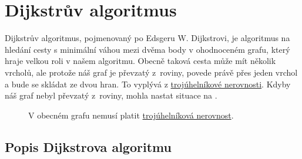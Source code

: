 \section{Dijkstrův algoritmus}
\label{sec:dijkstra}

Dijkstrův algoritmus, pojmenovaný po Edsgeru W. Dijkstrovi, je algoritmus na hledání cesty s minimální váhou mezi dvěma body v ohodnoceném grafu, který hraje velkou roli v našem algoritmu. Obecně taková cesta může mít několik vrcholů, ale protože náš graf je převzatý z~roviny, povede právě přes jeden vrchol a bude se skládat ze dvou hran. To vyplývá z \hyperref[definice:trojuhelnikova_nerovnost]{trojúhelníkové nerovnosti}. Kdyby náš graf nebyl převzatý z~roviny, mohla nastat situace na .

\begin{figure}[H]

    \centering
    \caption{V obecném grafu nemusí platit \hyperref[definice:trojuhelnikova_nerovnost]{trojúhelníková nerovnost}.}
    \label{obr:troj_ner_graf}
\end{figure}

\subsection{Popis Dijkstrova algoritmu}
\label{subsec:popis-algoritmu}

